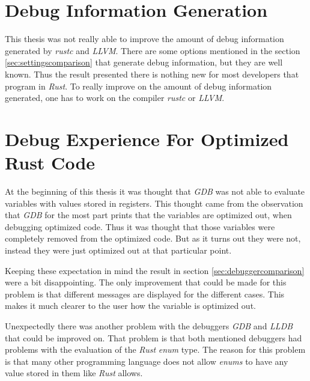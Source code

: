 



\section{Debug Information Generation}
This thesis was not really able to improve the amount of debug information generated by \emph{rustc} and \emph{LLVM}.
There are some options mentioned in the section \ref{sec:settingscomparison} that generate debug information, but they are well known.
Thus the result presented there is nothing new for most developers that program in \emph{Rust}.
To really improve on the amount of debug information generated, one has to work on the compiler \emph{rustc} or \emph{LLVM}.


\section{Debug Experience For Optimized Rust Code}
At the beginning of this thesis it was thought that \emph{GDB} was not able to evaluate variables with values stored in registers.
This thought came from the observation that \emph{GDB} for the most part prints that the variables are optimized out, when debugging optimized code.
Thus it was thought that those variables were completely removed from the optimized code.
But as it turns out they were not, instead they were just optimized out at that particular point.


Keeping these expectation in mind the result in section \ref{sec:debuggercomparison} were a bit disappointing.
The only improvement that could be made for this problem is that different messages are displayed for the different cases.
This makes it much clearer to the user how the variable is optimized out.


Unexpectedly there was another problem with the debuggers \emph{GDB} and \emph{LLDB} that could be improved on.
That problem is that both mentioned debuggers had problems with the evaluation of the \emph{Rust} \emph{enum} type.
The reason for this problem is that many other programming language does not allow \emph{enums} to have any value stored in them like \emph{Rust} allows.


